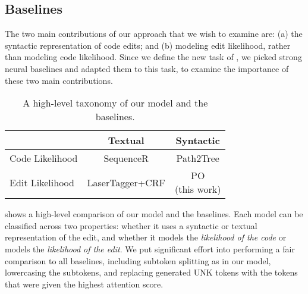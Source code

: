 \subsection{Baselines} \label{baselines}
The two main contributions of our approach that we wish to examine are:
(a) the syntactic representation of code edits; and (b) modeling edit likelihood, rather than modeling code likelihood.
Since we define the new task of \ourtask{}, we picked strong neural baselines and adapted them to this task, to examine the importance of these two main contributions.

\begin{table}[t]
\small
\begin{tabular}{lcc}
\toprule
    & Textual & Syntactic \\
    \midrule
Code Likelihood & \makecell[c]{SequenceR \\ \citep{DBLP:journals/corr/abs-1901-01808}} & \makecell[c]{Path2Tree \\  \cite{aharoni-goldberg-2017-towards}}  \\
\midrule
Edit Likelihood & \makecell[c]{LaserTagger+CRF \\ \cite{malmi2019lasertagger}} & \makecell[c]{\ctc{}PO \\ (this work)} \\
\bottomrule
\end{tabular}
\caption{A high-level taxonomy of our model and the baselines.}
\label{Ti:baselines}
\end{table}

 
 shows a high-level comparison of our model and the baselines. Each model can be classified across two properties: whether it uses a syntactic or textual representation of the edit, and whether it models the \emph{likelihood of the code} or models the \emph{likelihood of the edit}. 
We put significant effort into performing a fair comparison to all baselines, including subtoken splitting as in our model, lowercasing the subtokens, and replacing generated UNK tokens with the tokens that were given the highest attention score.

